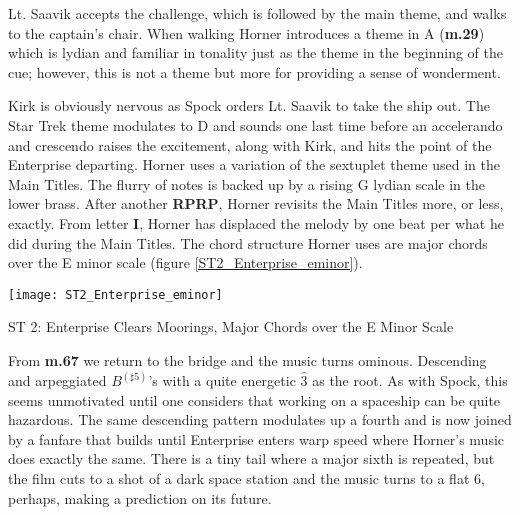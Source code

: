 Lt. Saavik accepts the challenge, which is followed by the main theme, and walks to the captain's chair. When walking Horner introduces a theme in A (\textbf{m.29}) which is lydian and familiar in tonality just as the theme in the beginning of the cue; however, this is not a theme but more for providing a sense of wonderment. 

Kirk is obviously nervous as Spock orders Lt. Saavik to take the ship out. The Star Trek theme modulates to D and sounds one last time before an accelerando and crescendo raises the excitement, along with Kirk, and hits the point of the Enterprise departing. Horner uses a variation of the sextuplet theme used in the Main Titles. The flurry of notes is backed up by a rising G lydian scale in the lower brass. After another \textbf{RPRP}, Horner revisits the Main Titles more, or less, exactly. From letter \textbf{I}, Horner has displaced the melody by one beat per what he did during the Main Titles. The chord structure Horner uses are major chords over the E minor scale (figure \ref{ST2_Enterprise_eminor}).

\begin{marginfigure}
\texttt{[image: ST2\_Enterprise\_eminor]}
	\caption{ST 2: Enterprise Clears Moorings, Major Chords over the E Minor Scale}
	\label{ST2_Enterprise_eminor}
\end{marginfigure}

From \textbf{m.67} we return to the bridge and the music turns ominous. Descending and arpeggiated \(B^{(\sharp5)}\)'s with a quite energetic \(\hat{3}\) as the root. As with Spock, this seems unmotivated until one considers that working on a spaceship can be quite hazardous. The same descending pattern modulates up a fourth and is now joined by a fanfare that builds until Enterprise enters warp speed where Horner's music does exactly the same. There is a tiny tail where a major sixth is repeated, but the film cuts to a shot of a dark space station and the music turns to a flat 6, perhaps, making a prediction on its future.

\clearpage


